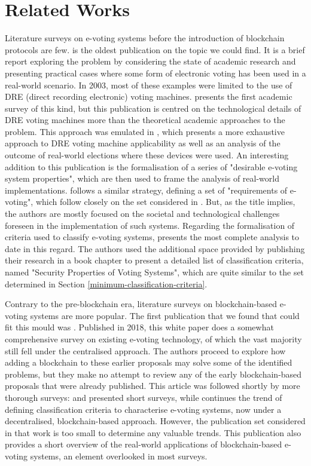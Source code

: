 \documentclass{ieeeaccess}
\begin{document}
    \section{Related Works}
    \label{related_works}
    Literature surveys on e-voting systems before the introduction of blockchain protocols are few. \cite{Bungale2003} is the oldest publication on the topic we could find. It is a brief report exploring the problem by considering the state of academic research and presenting practical cases where some form of electronic voting has been used in a real-world scenario. In 2003, most of these examples were limited to the use of DRE (direct recording electronic) voting machines. \cite{Weldemariam2010} presents the first academic survey of this kind, but this publication is centred on the technological details of DRE voting machines more than the theoretical academic approaches to the problem. This approach was emulated in \cite{OMeara2013}, which presents a more exhaustive approach to DRE voting machine applicability as well as an analysis of the outcome of real-world elections where these devices were used. An interesting addition to this publication is the formalisation of a series of "desirable e-voting system properties", which are then used to frame the analysis of real-world implementations. \cite{AlSammak2015} follows a similar strategy, defining a set of "requirements of e-voting", which follow closely on the set considered in \cite{OMeara2013}. But, as the title implies, the authors are mostly focused on the societal and technological challenges foreseen in the implementation of such systems. Regarding the formalisation of criteria used to classify e-voting systems, \cite{Ali2016} presents the most complete analysis to date in this regard. The authors used the additional space provided by publishing their research in a book chapter to present a detailed list of classification criteria, named "Security Properties of Voting Systems", which are quite similar to the set determined in Section \ref{minimum-classification-criteria}.
    \par
    Contrary to the pre-blockchain era, literature surveys on blockchain-based e-voting systems are more popular. The first publication that we found that could fit this mould was \cite{Nasser2018}. Published in 2018, this white paper does a somewhat comprehensive survey on existing e-voting technology, of which the vast majority still fell under the centralised approach. The authors proceed to explore how adding a blockchain to these earlier proposals may solve some of the identified problems, but they make no attempt to review any of the early blockchain-based proposals that were already published. This article was followed shortly by more thorough surveys: \cite{Kadam2019} and \cite{Sayyad2019} presented short surveys, while \cite{Abuidris2019} continues the trend of defining classification criteria to characterise e-voting systems, now under a decentralised, blockchain-based approach. However, the publication set considered in that work is too small to determine any valuable trends. This publication also provides a short overview of the real-world applications of blockchain-based e-voting systems, an element overlooked in most surveys.
\end{document}
